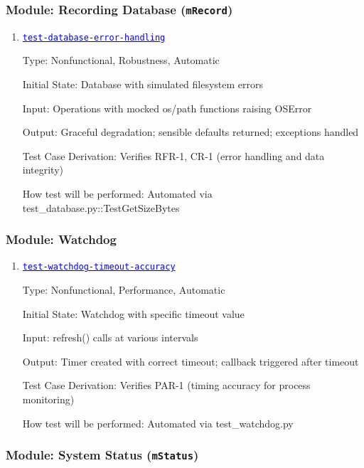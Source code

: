 \documentclass[12pt, titlepage]{article}
\newcommand{\mref}[1]{\texttt{#1}}
\newcommand{\tid}[1]{\hyperlink{tid:#1}{\textcolor{blue}{\texttt{#1}}}}
\begin{document}
\subsubsection{Module: Recording Database (\mref{mRecord})}

\begin{enumerate}

  \item{\tid{test-database-error-handling}\\}

        Type: Nonfunctional, Robustness, Automatic

        Initial State: Database with simulated filesystem errors

        Input: Operations with mocked os/path functions raising OSError

        Output: Graceful degradation; sensible defaults returned; exceptions handled

        Test Case Derivation: Verifies RFR-1, CR-1 (error handling and data integrity)

        How test will be performed: Automated via test\_database.py::TestGetSizeBytes

\end{enumerate}

\subsubsection{Module: Watchdog}

\begin{enumerate}

  \item{\tid{test-watchdog-timeout-accuracy}\\}

        Type: Nonfunctional, Performance, Automatic

        Initial State: Watchdog with specific timeout value

        Input: refresh() calls at various intervals

        Output: Timer created with correct timeout; callback triggered after timeout

        Test Case Derivation: Verifies PAR-1 (timing accuracy for process monitoring)

        How test will be performed: Automated via test\_watchdog.py

\end{enumerate}

\subsubsection{Module: System Status (\mref{mStatus})}
\end{document}
